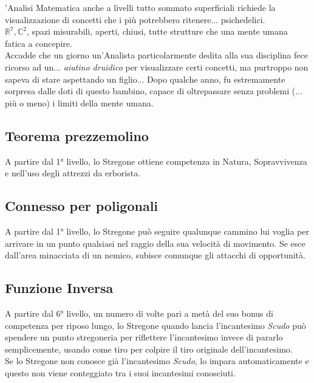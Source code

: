 'Analisi Matematica anche a livelli tutto sommato superficiali richiede la visualizzazione di concetti che i più potrebbero ritenere... psichedelici. \\ \begin{math} \mathbb{R}^7, \mathbb{C}^2\end{math}, spazi misurabili, aperti, chiusi, tutte strutture che una mente umana fatica a concepire. \\ Accadde che un giorno un'Analista particolarmente dedita alla sua disciplina fece ricorso ad un... \textit{aiutino druidico} per visualizzare certi concetti, ma purtroppo non sapeva di stare aspettando un figlio... Dopo qualche anno, fu estremamente sorpresa dalle doti di questo bambino, capace di oltrepassare senza problemi (... più o meno) i limiti della mente umana.

\subsection{Teorema prezzemolino}

A partire dal 1° livello, lo Stregone ottiene competenza in Natura, Sopravvivenza e nell'uso degli attrezzi da erborista.

\subsection{Connesso per poligonali}

A partire dal 1° livello, lo Stregone può seguire qualunque cammino lui voglia per arrivare in un punto qualsiasi nel raggio della sua velocità di movimento. Se esce dall'area minacciata di un nemico, subisce comunque gli attacchi di opportunità.

\subsection{Funzione Inversa}

A partire dal 6° livello, un numero di volte pari a metà del suo bonus di competenza per riposo lungo, lo Stregone quando lancia l'incantesimo \textit{Scudo} può spendere un punto stregoneria per riflettere l'incantesimo invece di pararlo semplicemente, usando come tiro per colpire il tiro originale dell'incantesimo. \\ Se lo Stregone non conosce già l'incantesimo \textit{Scudo}, lo impara automaticamente e questo non viene conteggiato tra i suoi incantesimi conosciuti.

